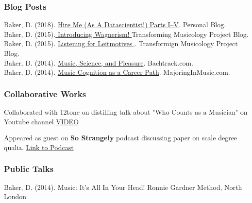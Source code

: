 \subsubsection{Blog Posts}
Baker, D. (2018). \href{https://davidjohnbaker.rbind.io/post/hire-me-as-a-data-scientist-part-i/}{Hire Me (As A Datascientist!) Parts I--V}. Personal Blog.\\
Baker, D. (2015).\href{http://transforming-musicology.org/blog/2014-09-30_introducing-wagnerism/} { Introducing Wagnerism! } Transforming Musicology Project Blog.\\
Baker, D. (2015). \href{http://transforming-musicology.org/blog/2014-05-19_listening-for-leitmotives-in-wagner/}{ Listening for Leitmotives }. Transformign Musicology Project Blog.\\
Baker, D. (2014). \href{https://bachtrack.com/review-feb-2014-technology-science}{Music, Science, and Pleasure}. Bachtrack.com. \\
Baker, D. (2014). \href{http://majoringinmusic.com/music-cognition-career-path/}{Music Cognition as a Career Path}. MajoringInMusic.com.\\
\vspace{-.75cm}
\subsubsection{Collaborative Works}
Collaborated with 12tone on distilling talk about "Who Counts as a Musician" on Youtube channel \href{https://www.youtube.com/watch?v=RHRzpqs2IeA}{VIDEO}

Appeared as guest on \textbf{So Strangely} podcast discussing paper on scale degree qualia. \href{http://sostrangely.com/332/}{Link to Podcast}

\subsubsection{Public Talks}
Baker, D. (2014). Music: It's All In Your Head! Ronnie Gardner Method, North London





\vspace{0.2in} %

\pagebreak
